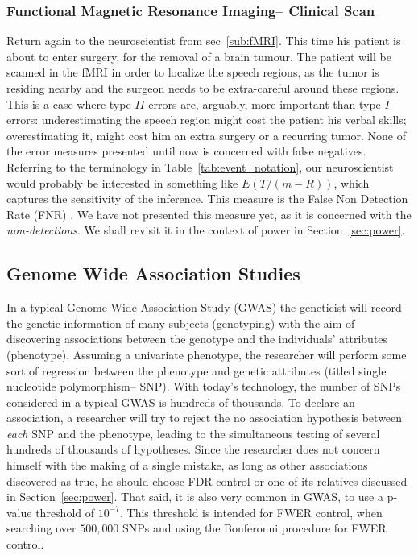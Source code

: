 \documentclass[review,12pt]{article}
\begin{document}
\subsubsection{Functional Magnetic Resonance Imaging-- Clinical Scan}
Return again to the neuroscientist from sec~\ref{sub:fMRI}. This time his patient is about to enter surgery, for the removal of a brain tumour. The patient will be scanned in the fMRI in order to localize the speech regions, as the tumor is residing nearby and the surgeon needs to be extra-careful around these regions. This is a case where type $II$ errors are, arguably, more important than type $I$ errors: underestimating the speech region might cost the patient his verbal skills; overestimating it, might cost him an extra surgery or a recurring tumor. None of the error measures presented until now is concerned with false negatives. Referring to the terminology in Table~\ref{tab:event_notation}, our neuroscientist would probably be interested in something like $E(T/(m-R))$, which captures the sensitivity of the inference. This measure is the False Non Detection Rate (FNR) \citep{genovese_operating_2002}. We have not presented this measure yet, as it is concerned with the \emph{non-detections}. We shall revisit it in the context of power in Section~\ref{sec:power}. 




\subsection{Genome Wide Association Studies}
In a typical Genome Wide Association Study (GWAS) the geneticist will record the genetic information of many subjects (genotyping) with the aim of discovering associations between the genotype and the individuals' attributes (phenotype). Assuming a univariate phenotype, the researcher will perform some sort of regression between the phenotype and genetic attributes (titled single nucleotide polymorphism-- SNP). With today's technology, the number of SNPs considered in a typical GWAS is hundreds of thousands. To declare an association, a researcher will try to reject the no association hypothesis between \emph{each} SNP and the phenotype, leading to the simultaneous testing of several hundreds of thousands of hypotheses. 
Since the researcher does not concern himself with the making of a single mistake, as long as other associations discovered as true, he should choose FDR control or one of its relatives discussed in Section~\ref{sec:power}. 
That said, it is also very common in GWAS, to use a p-value threshold of $10^{-7}$. This threshold is intended for FWER control, when searching over $500,000$ SNPs and using the Bonferonni procedure \cite{bush_chapter_2012} for FWER control. 
\end{document}

